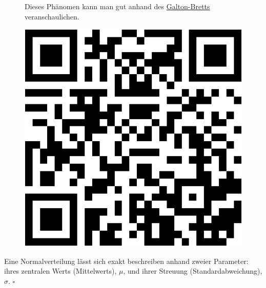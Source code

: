 \documentclass[
  letterpaper,
]{scrbook}
\theoremstyle{definition}
\theoremstyle{definition}
\theoremstyle{definition}
\theoremstyle{remark}
\begin{document}
\begin{figure}

\begin{minipage}{0.80\linewidth}
Dieses Phänomen kann man gut anhand des
\href{https://www.youtube.com/watch?v=3m4bxse2JEQ}{Galton-Bretts}
veranschaulichen.\end{minipage}%
%
\begin{minipage}{0.20\linewidth}

\begin{center}
\includegraphics[width=0.75\linewidth,height=\textheight,keepaspectratio]{040-verbildlichen_files/figure-pdf/unnamed-chunk-17-1.pdf}
\end{center}

\end{minipage}%

\end{figure}%

\begin{tcolorbox}[enhanced jigsaw, colbacktitle=quarto-callout-important-color!10!white, coltitle=black, bottomrule=.15mm, rightrule=.15mm, arc=.35mm, toptitle=1mm, colframe=quarto-callout-important-color-frame, opacitybacktitle=0.6, left=2mm, leftrule=.75mm, breakable, opacityback=0, bottomtitle=1mm, titlerule=0mm, title=\textcolor{quarto-callout-important-color}{\faExclamation}\hspace{0.5em}{Parameter der Normalverteilung}, colback=white, toprule=.15mm]

Eine Normalverteilung lässt sich exakt beschreiben anhand zweier
Parameter: ihres zentralen Werts (Mittelwerts), \(\mu\), und ihrer
Streuung (Standardabweichung), \(\sigma\). \(\square\)

\end{tcolorbox}
\end{document}
